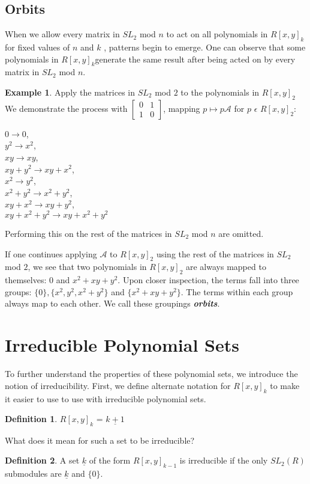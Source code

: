 \documentclass[a4paper,draft]{amsproc}
\theoremstyle{plain}
\theoremstyle{definition}
\newtheorem{exm}{Example}[section]
\newtheorem{dfn}{Definition}[section]
\theoremstyle{remark}
\numberwithin{equation}{section}
\begin{document}
\subsection{Orbits}
When we allow every matrix in $SL_{2}$ mod $n$ to act on all polynomials in $R[x,y]_{k}$for fixed values of $n$ and $k$ , patterns begin to emerge.
One can observe that some polynomials in $R[x,y]_{k}$generate the same result after being acted on by every matrix in $SL_{2}$ mod $n$. 
\begin{exm}
Apply the matrices in $SL_{2}$ mod $2$ to the polynomials in $R[x,y]_{2}$ 
We demonstrate the process with $\begin{bmatrix}
 0&1 \\ 
 1&0 
\end{bmatrix} $, mapping $p \mapsto p\mathcal{A}$ for $p$ $\epsilon$ $R[x,y]_{2}$: \\

\begin{center}
$0 \rightarrow 0$, \\
$y^{2} \rightarrow x^{2}$, \\
$xy \rightarrow xy$, \\
$xy + y^{2} \rightarrow xy + x^{2}$, \\
$x^{2} \rightarrow y^{2}$, \\
$x^{2} + y^{2} \rightarrow x^{2} + y^{2}$, \\
$xy + x^{2} \rightarrow xy + y^{2}$, \\
$xy + x^{2} + y^{2} \rightarrow xy + x^{2} + y^{2}$
\end{center}

Performing this on the rest of the matrices in $SL_{2}$ mod $n$ are omitted.

\end{exm}

If one continues applying $\mathcal{A}$ to $R[x,y]_{2}$ using the rest of the matrices in $SL_{2}$ mod $2$, we see that two polynomials in $R[x,y]_{2}$ are always mapped to themselves: 0 and $x^{2} + xy + y^{2}$. Upon closer inspection, the terms fall into three groups: $\{0\}, \{x^{2}, y^{2}, x^{2} + y^{2}\}$ and $\{x^{2} + xy + y^{2}\}$. The terms within each group always map to each other. We call these groupings \textit{\textbf{orbits}}. 

\section{Irreducible Polynomial Sets}
To further understand the properties of these polynomial sets, we introduce the notion of irreducibility. 
First, we define alternate notation for $R[x,y]_{k}$ to make it easier to use to use with irreducible polynomial sets. 
\begin{dfn}
$R[x,y]_{k}$ = $\underline{k+1}$
\end{dfn} 
What does it mean for such a set to be irreducible? 
\begin{dfn}
A set $\underline{k}$ of the form $R[x,y]_{k-1}$ is irreducible if the only $SL_{2}(R)$ submodules are  $\underline{k}$ and $\{0\}$. 
\end{dfn} 
\end{document}
